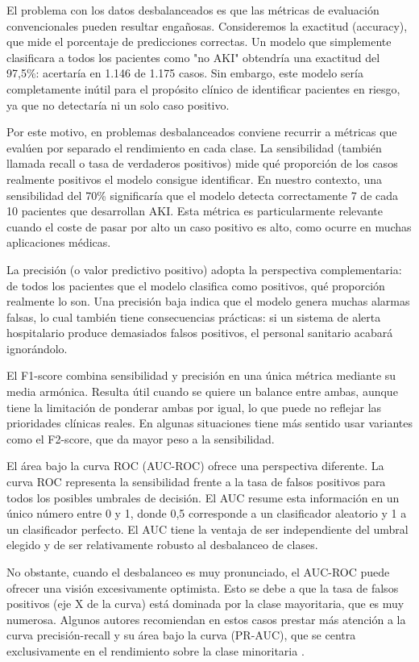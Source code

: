 \documentclass[12pt, a4paper, oneside]{report}
\begin{document}
El problema con los datos desbalanceados es que las métricas de evaluación convencionales pueden resultar engañosas. Consideremos la exactitud (accuracy), que mide el porcentaje de predicciones correctas. Un modelo que simplemente clasificara a todos los pacientes como "no AKI" obtendría una exactitud del 97,5\%: acertaría en 1.146 de 1.175 casos. Sin embargo, este modelo sería completamente inútil para el propósito clínico de identificar pacientes en riesgo, ya que no detectaría ni un solo caso positivo.

Por este motivo, en problemas desbalanceados conviene recurrir a métricas que evalúen por separado el rendimiento en cada clase. La sensibilidad (también llamada recall o tasa de verdaderos positivos) mide qué proporción de los casos realmente positivos el modelo consigue identificar. En nuestro contexto, una sensibilidad del 70\% significaría que el modelo detecta correctamente 7 de cada 10 pacientes que desarrollan AKI. Esta métrica es particularmente relevante cuando el coste de pasar por alto un caso positivo es alto, como ocurre en muchas aplicaciones médicas.

La precisión (o valor predictivo positivo) adopta la perspectiva complementaria: de todos los pacientes que el modelo clasifica como positivos, qué proporción realmente lo son. Una precisión baja indica que el modelo genera muchas alarmas falsas, lo cual también tiene consecuencias prácticas: si un sistema de alerta hospitalario produce demasiados falsos positivos, el personal sanitario acabará ignorándolo.

El F1-score combina sensibilidad y precisión en una única métrica mediante su media armónica. Resulta útil cuando se quiere un balance entre ambas, aunque tiene la limitación de ponderar ambas por igual, lo que puede no reflejar las prioridades clínicas reales. En algunas situaciones tiene más sentido usar variantes como el F2-score, que da mayor peso a la sensibilidad.

El área bajo la curva ROC (AUC-ROC) ofrece una perspectiva diferente. La curva ROC representa la sensibilidad frente a la tasa de falsos positivos para todos los posibles umbrales de decisión. El AUC resume esta información en un único número entre 0 y 1, donde 0,5 corresponde a un clasificador aleatorio y 1 a un clasificador perfecto. El AUC tiene la ventaja de ser independiente del umbral elegido y de ser relativamente robusto al desbalanceo de clases.

No obstante, cuando el desbalanceo es muy pronunciado, el AUC-ROC puede ofrecer una visión excesivamente optimista. Esto se debe a que la tasa de falsos positivos (eje X de la curva) está dominada por la clase mayoritaria, que es muy numerosa. Algunos autores recomiendan en estos casos prestar más atención a la curva precisión-recall y su área bajo la curva (PR-AUC), que se centra exclusivamente en el rendimiento sobre la clase minoritaria \parencite{saito2015prroc}.
\end{document}
